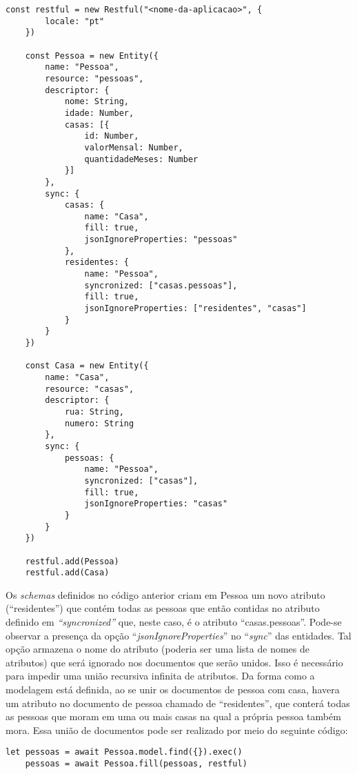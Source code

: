 \begin{lstlisting}[style=ES6, caption={Definição de \textit{Schemas} no \textit{Alpha Restful}}]
    const restful = new Restful("<nome-da-aplicacao>", {
        locale: "pt"
    })

    const Pessoa = new Entity({
        name: "Pessoa",
        resource: "pessoas",
        descriptor: {
            nome: String,
            idade: Number,
            casas: [{
                id: Number,
                valorMensal: Number,
                quantidadeMeses: Number
            }]
        },
        sync: {
            casas: {
                name: "Casa",
                fill: true,
                jsonIgnoreProperties: "pessoas"
            },
            residentes: {
                name: "Pessoa",
                syncronized: ["casas.pessoas"],
                fill: true,
                jsonIgnoreProperties: ["residentes", "casas"]
            }
        }
    })
    
    const Casa = new Entity({
        name: "Casa",
        resource: "casas",
        descriptor: {
            rua: String,
            numero: String
        },
        sync: {
            pessoas: {
                name: "Pessoa",
                syncronized: ["casas"],
                fill: true,
                jsonIgnoreProperties: "casas"
            }
        }
    })
    
    restful.add(Pessoa)
    restful.add(Casa)
\end{lstlisting}

Os \textit{schemas} definidos no código anterior criam em Pessoa um novo atributo (``residentes'') que contém todas as pessoas que então contidas no atributo definido em \textit{``syncronized''} que, neste caso, é o atributo ``casas.pessoas''. Pode-se observar a presença da opção ``\textit{jsonIgnoreProperties}'' no ``\textit{sync}'' das entidades. Tal opção armazena o nome do atributo (poderia ser uma lista de nomes de atributos) que será ignorado nos documentos que serão unidos. Isso é necessário para impedir uma união recursiva infinita de atributos. Da forma como a modelagem está definida, ao se unir os documentos de pessoa com casa, havera um atributo no documento de pessoa chamado de ``residentes'', que conterá todas as pessoas que moram em uma ou mais casas na qual a própria pessoa também mora. Essa união de documentos pode ser realizado por meio do seguinte código:

\begin{lstlisting}[style=ES6, caption={União de Documentos Com o \textit{Alpha Restful}}]
	let pessoas = await Pessoa.model.find({}).exec()
	pessoas = await Pessoa.fill(pessoas, restful)
\end{lstlisting}

